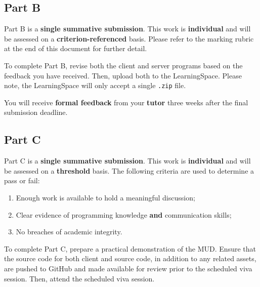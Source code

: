 \documentclass{../../fal_assignment}
\begin{document}
\subsection*{Part B}

Part B is a \textbf{single summative submission}. This work is \textbf{individual} and will be assessed on a \textbf{criterion-referenced} basis. Please refer to the marking rubric at the end of this document for further detail.

To complete Part B, revise both the client and server programs based on the feedback you have received. Then, upload both to the LearningSpace. Please note, the LearningSpace will only accept a single \texttt{.zip} file.

You will receive \textbf{formal feedback} from your \textbf{tutor} three weeks after the final submission deadline.

\subsection*{Part C}

Part C is a \textbf{single summative submission}. This work is \textbf{individual} and will be assessed on a \textbf{threshold} basis.  The following criteria are used to determine a pass or fail:

\begin{enumerate}[label=(\alph*)]
	\item Enough work is available to hold a meaningful discussion;
	\item Clear evidence of programming knowledge \textbf{and} communication skills;
	\item No breaches of academic integrity.
\end{enumerate}

To complete Part C, prepare a practical demonstration of the MUD. Ensure that the source code for both client and source code, in addition to any related assets, are pushed to GitHub and made available for review prior to the scheduled viva session. Then, attend the scheduled viva session.

\end{document}
